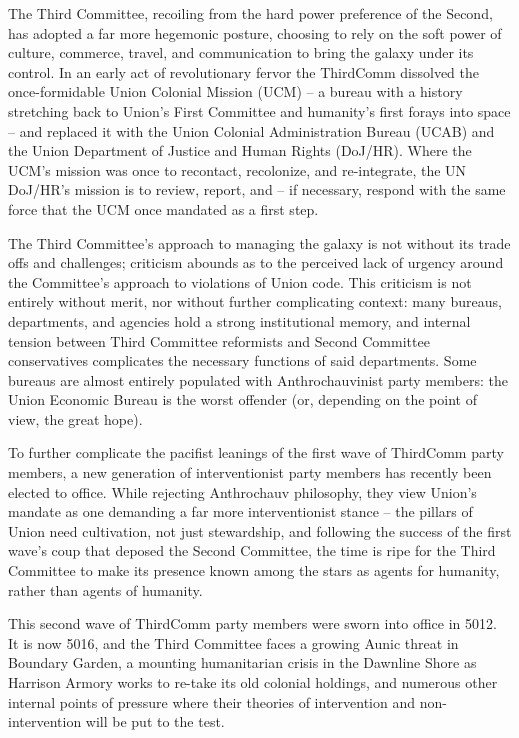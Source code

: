 The Third Committee, recoiling from the hard power preference of the Second, has adopted a far  
more hegemonic posture, choosing to rely on the soft power of culture, commerce, travel, and  
communication to bring the galaxy under its control. In an early act of revolutionary fervor the  
ThirdComm dissolved the once-formidable Union Colonial Mission (UCM) -- a bureau with a  
history stretching back to Union’s First Committee and humanity’s first forays into space -- and  
replaced it with the Union Colonial Administration Bureau (UCAB) and the Union Department of  
Justice and Human Rights (DoJ/HR). Where the UCM’s mission was once to recontact,  
recolonize, and re-integrate, the UN DoJ/HR’s mission is to review, report, and -- if necessary,  
respond with the same force that the UCM once mandated as a first step.   

The Third Committee’s approach to managing the galaxy is not without its trade offs and  
challenges; criticism abounds as to the perceived lack of urgency around the Committee’s  
approach to violations of Union code. This criticism is not entirely without merit, nor without further  
complicating context: many bureaus, departments, and agencies hold a strong institutional  
memory, and internal tension between Third Committee reformists and Second Committee  
conservatives complicates the necessary functions of said departments. Some bureaus are  
almost entirely populated with Anthrochauvinist party members: the Union Economic Bureau is  
the worst offender (or, depending on the point of view, the great hope).   

To further complicate the pacifist leanings of the first wave of ThirdComm party members, a new  
generation of interventionist party members has recently been elected to office. While rejecting  
Anthrochauv philosophy, they view Union’s mandate as one demanding a far more interventionist  
stance -- the pillars of Union need cultivation, not just stewardship, and following the success of  
the first wave’s coup that deposed the Second Committee, the time is ripe for the Third  
Committee to make its presence known among the stars as agents for humanity, rather than  
agents of humanity.   

This second wave of ThirdComm party members were sworn into office in 5012. It is now 5016,  
and the Third Committee faces a growing Aunic threat in Boundary Garden, a mounting  
humanitarian crisis in the Dawnline Shore as Harrison Armory works to re-take its old colonial  
holdings, and numerous other internal points of pressure where their theories of intervention and  
non-intervention will be put to the test.   

